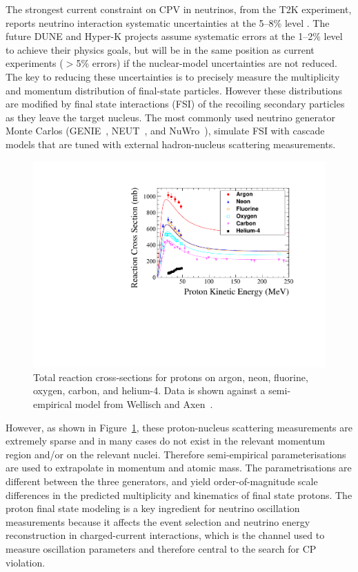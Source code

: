 The strongest current constraint on CPV in neutrinos, from the T2K experiment, reports neutrino interaction systematic uncertainties at the 5--8\% level \cite{Abe:2018wpn}.
The future DUNE and Hyper-K projects assume systematic errors at the 1--2\% level to achieve their physics goals, but will be in the same position as current experiments ($>$5\% errors) if the nuclear-model uncertainties are not reduced.  
The key to reducing these uncertainties is to precisely measure the multiplicity and momentum distribution of final-state particles. 
However these distributions are modified by final state interactions (FSI) of the recoiling secondary particles as they leave the target nucleus.  
The most commonly used neutrino generator Monte Carlos (GENIE~\cite{Andreopoulos:2009rq}, NEUT~\cite{Hayato:2009zz}, and NuWro~\cite{GOLAN2012499}), simulate FSI with cascade models that are tuned with external hadron-nucleus scattering measurements.
\begin{figure}%
    \centering
    \includegraphics[width=12cm]{files/Figures/DataProtonCrossSections.pdf}%
    \caption{Total reaction cross-sections for protons on  argon, neon, fluorine, oxygen, carbon, and helium-4. Data is shown against a semi-empirical model from Wellisch and Axen~\cite{wellisch1996total}.}
    \label{fig:DataProtonXSec}%
\end{figure}


However, as shown in Figure~\ref{fig:DataProtonXSec}, these proton-nucleus scattering measurements are extremely sparse and in many cases do not exist in the relevant momentum region and/or on the relevant nuclei.
Therefore semi-empirical parameterisations are used to extrapolate in momentum and atomic mass.  
The parametrisations are different between the three generators, and yield order-of-magnitude scale differences in the predicted multiplicity and kinematics of final state protons.
The proton final state modeling is a key ingredient for neutrino oscillation measurements because it affects the event selection and neutrino energy reconstruction in charged-current interactions, which is the channel used to measure oscillation parameters and therefore central to the search for CP violation.

